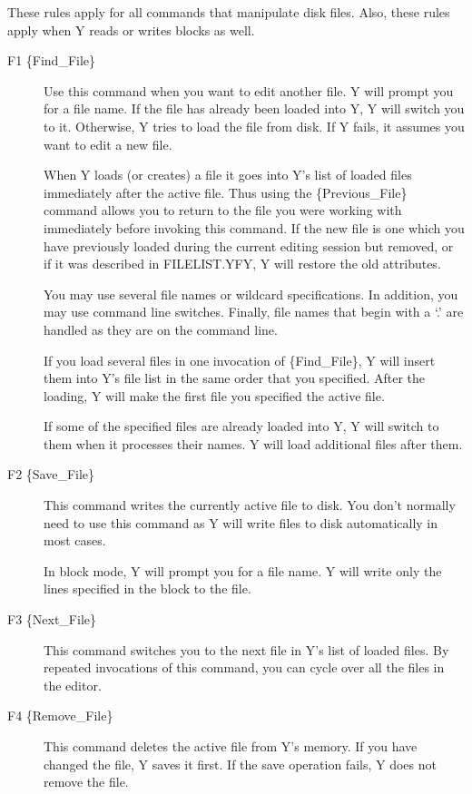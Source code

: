 These rules apply for all commands that manipulate disk files. Also, these rules apply when Y
reads or writes blocks as well.

\begin{description}

\item[F1 \{Find\_File\}] Use this command when you want to edit another file. Y will prompt you
  for a file name. If the file has already been loaded into Y, Y will switch you to it.
  Otherwise, Y tries to load the file from disk. If Y fails, it assumes you want to edit a new
  file.

  When Y loads (or creates) a file it goes into Y's list of loaded files immediately after the
  active file. Thus using the \{Previous\_File\} command  allows you to return to
  the file you were working with immediately before invoking this command. If the new file is
  one which you have previously loaded during the current editing session but removed, or if it
  was described in FILELIST.YFY, Y will restore the old attributes.

  You may use several file names or wildcard specifications. In addition, you may use command
  line switches. Finally, file names that begin with a `.' are handled as they are on the
  command line.

  If you load several files in one invocation of \{Find\_File\}, Y will insert them into Y's
  file list in the same order that you specified. After the loading, Y will make the first file
  you specified the active file.

  If some of the specified files are already loaded into Y, Y will switch to them when it
  processes their names. Y will load additional files after them.

\item[F2 \{Save\_File\}] This command writes the currently active file to disk. You don't
  normally need to use this command as Y will write files to disk automatically in most cases.

  In block mode, Y will prompt you for a file name. Y will write only the lines specified in the
  block to the file.

\item[F3 \{Next\_File\}] This command switches you to the next file in Y's list of loaded files.
  By repeated invocations of this command, you can cycle over all the files in the editor.

\item[F4 \{Remove\_File\}] This command deletes the active file from Y's memory. If you have
  changed the file, Y saves it first. If the save operation fails, Y does not remove the file.


\end{description}
